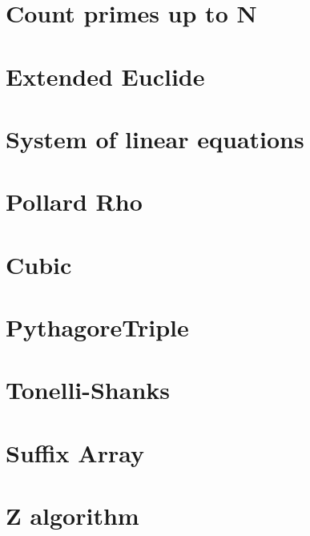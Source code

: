 \section{Count primes up to N}
\raggedbottom
\hrulefill

\section{Extended Euclide}
\raggedbottom
\hrulefill

\section{System of linear equations}
\raggedbottom
\hrulefill

\section{Pollard Rho}
\raggedbottom
\hrulefill

\section{Cubic}
\raggedbottom
\hrulefill

\section{PythagoreTriple}
\raggedbottom
\hrulefill

\section{Tonelli-Shanks}
\raggedbottom
\hrulefill

\section{Suffix Array}
\raggedbottom
\hrulefill

\section{Z algorithm}
\raggedbottom
\hrulefill


